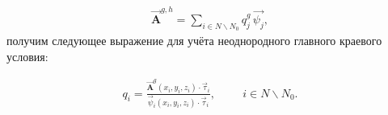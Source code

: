 \begin{equation} \label{eq_1_19}
	\begin{gathered}
		\overrightarrow{\textbf{A}}^{g,h} = \sum \limits_{i \in N \backslash N_0} q_j^g \, \overrightarrow{\psi_j},
	\end{gathered}
\end{equation}
получим следующее выражение для учёта неоднородного главного краевого условия:

\begin{equation} \label{eq_1_20}
	\begin{gathered}
		q_i = \frac{\overrightarrow{\textbf{A}}^g \left(x_i, y_i, z_i\right) \cdot \overrightarrow{\tau}_i}{\overrightarrow{\psi}_i \left(x_i, y_i, z_i\right) \cdot \overrightarrow{\tau}_i}, \hspace{1cm} i \in N \backslash N_0.
	\end{gathered}
\end{equation}


